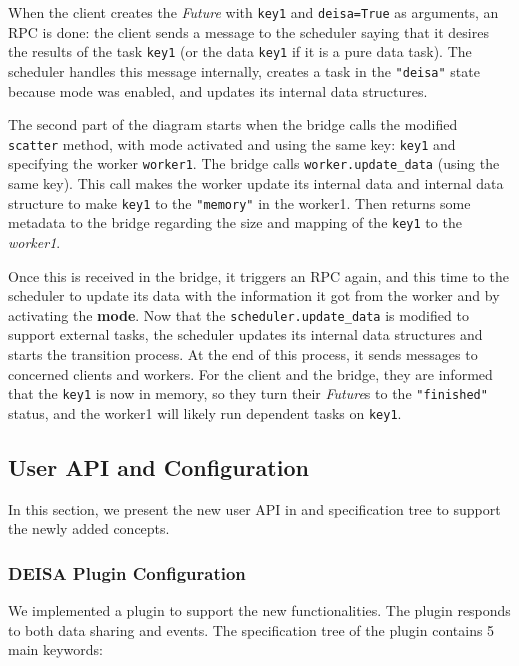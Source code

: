 When the client creates the \textit{Future} with \texttt{key1} and \texttt{deisa=True} as arguments, an RPC is done: the client sends a message to the scheduler saying that it desires the results of the task \texttt{key1} (or the data \texttt{key1} if it is a pure data task). The scheduler handles this message internally, creates a task in the \texttt{"deisa"} state because \deisa mode was enabled, and updates its internal data structures. 

The second part of the diagram starts when the bridge calls the modified \texttt{scatter} method, with \deisa mode activated and using the same key: \texttt{key1} and specifying the worker \texttt{worker1}. The bridge calls \texttt{worker.update\_data} (using the same key). This call makes the worker update its internal data and internal data structure to make \texttt{key1} to the \texttt{"memory"} in the worker1. Then returns some metadata to the bridge regarding the size and mapping of the \texttt{key1} to the \textit{worker1}.

Once this is received in the bridge, it triggers an RPC again, and this time to the scheduler to update its data with the information it got from the worker and by activating the \textbf{\deisa mode}. Now that the \texttt{scheduler.update\_data} is modified to support external tasks, the scheduler updates its internal data structures and starts the transition process. At the end of this process, it sends messages to concerned clients and workers. For the client and the bridge, they are informed that the \texttt{key1} is now in memory, so they turn their \textit{Future}s to the \texttt{"finished"} status, and the worker1 will likely run dependent tasks on \texttt{key1}.


\subsection{User API and Configuration}
In this section, we present the new user API in \deisa and \pdi specification tree to support the newly added concepts. 

\subsubsection{DEISA Plugin Configuration}

We implemented a \deisa plugin to support the new functionalities. The plugin responds to both data sharing and \pdi events. The specification tree of the plugin contains 5 main keywords:

